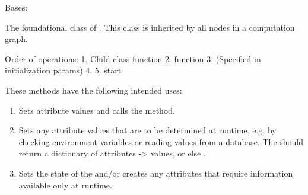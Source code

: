 \documentclass[letterpaper,10pt,english]{sphinxmanual}
\begin{document}
\begin{fulllineitems}
\label{\detokenize{api:nanostream.node.NanoNode}}
Bases: 

The foundational class of . This class is inherited by all
nodes in a computation graph.

Order of operations:
1. Child class  function
2.   function
3.  (Specified in initialization params)
4. 
5. start

These methods have the following intended uses:
\begin{enumerate}
\def\theenumi{\arabic{enumi}}
\def\labelenumi{\theenumi .}
\makeatletter\def\p@enumii{\p@enumi \theenumi .}\makeatother
\item {} 
 Sets attribute values and calls the  
method.

\item {} 
 Sets any attribute values that are to be determined
at runtime, e.g. by checking environment variables or reading values
from a database. The  should return a dictionary
of attributes -\textgreater{} values, or else .

\item {} 
 Sets the state of the  and/or creates any attributes
that require information available only at runtime.


\end{enumerate}
\end{fulllineitems}
\end{document}
